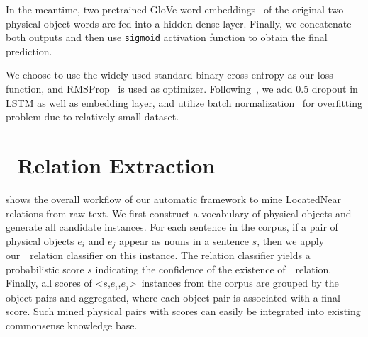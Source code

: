 In the meantime, two pretrained GloVe word embeddings~\cite{pennington2014glove} of the original two physical object words are fed into a hidden dense layer. 
Finally, we concatenate both outputs and then use \texttt{sigmoid} activation function to obtain the final prediction.

{We choose to use the widely-used standard binary cross-entropy as our loss function, and
	RMSProp~\cite{hinton2012neural} is used as optimizer. Following~\cite{zaremba2014recurrent}, we add 0.5 dropout in LSTM as well as embedding layer, and utilize batch normalization~\cite{ioffe2015batch,cooijmans2016recurrent} for overfitting problem due to relatively small dataset.}

\section{\lnear\  Relation Extraction}
\label{sec:mine}
 shows the overall workflow of our automatic framework to mine LocatedNear relations from raw text.
We first construct a vocabulary of physical objects and generate all candidate instances. 
For each sentence in the corpus, if a pair of physical objects $e_i$ and $e_j$ appear as nouns in a sentence $s$, then we apply our~\lnear\ relation classifier on this instance. 
The relation classifier yields a probabilistic score $s$
indicating the confidence of the existence of~\lnear~relation.
Finally, all scores of \textless $s$,$e_i$,$e_j$\textgreater~instances from the corpus are grouped by the object pairs and aggregated, where each object
pair is associated with a final score. 
Such mined physical pairs with scores can easily be integrated into existing commonsense knowledge base.

